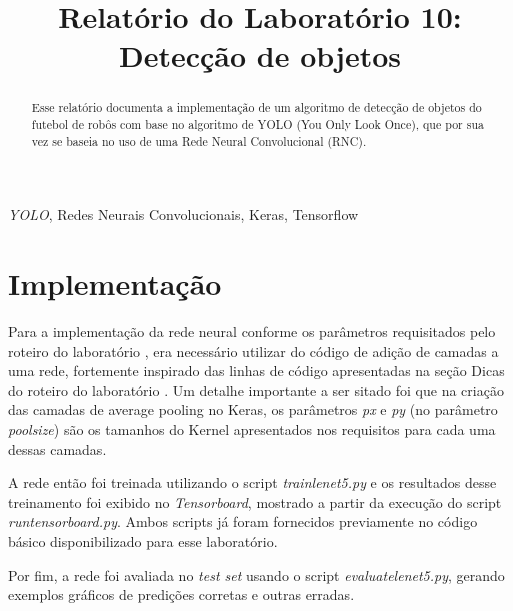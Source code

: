 \documentclass[conference]{IEEEtran}
\begin{document}
\title{Relatório do Laboratório 10: \\ Detecção de objetos\\
}

\author{
}

\maketitle

\begin{abstract}
Esse relatório documenta a implementação de um algoritmo de detecção de objetos do futebol de robôs com base no algoritmo de YOLO (You Only Look Once), que por sua vez se baseia no uso de uma Rede Neural Convolucional (RNC).
\end{abstract}

\begin{IEEEkeywords}
\textit{YOLO}, Redes Neurais Convolucionais, Keras, Tensorflow
\end{IEEEkeywords}

\section{Implementação}
Para a implementação da rede neural conforme os parâmetros requisitados pelo roteiro do laboratório \cite{roteiro}, era necessário utilizar do código de adição de camadas a uma rede, fortemente inspirado das linhas de código apresentadas na seção Dicas do roteiro do laboratório \cite{roteiro}. Um detalhe importante a ser sitado foi que na criação das camadas de average pooling no Keras, os parâmetros \textit{px} e \textit{py} (no parâmetro \textit{pool\underline{\space}size}) são os tamanhos do Kernel apresentados nos requisitos para cada uma dessas camadas.

A rede então foi treinada utilizando o script \textit{train\underline{\space}lenet5.py} e os resultados desse treinamento foi exibido no \textit{Tensorboard}, mostrado a partir da execução do script \textit{run\underline{\space}tensorboard.py}. Ambos scripts já foram fornecidos previamente no código básico disponibilizado para esse laboratório.

Por fim, a rede foi avaliada no \textit{test set} usando o script \textit{evaluate\underline{\space}lenet5.py}, gerando exemplos gráficos de predições corretas e outras erradas.
\end{document}
